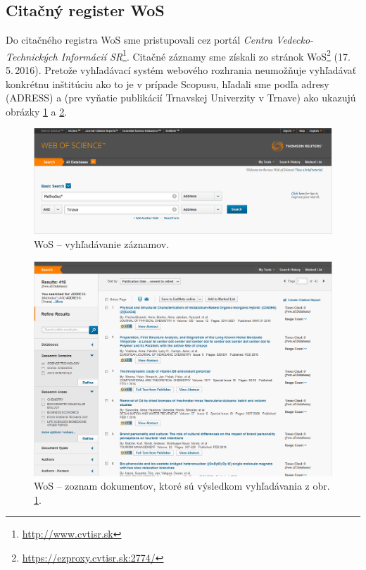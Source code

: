 \subsection{Citačný register WoS}

Do citačného registra WoS sme pristupovali cez portál \emph{Centra
  Vedecko-Technických Informácií SR}\footnote{\url{http://www.cvtisr.sk}}.
Citačné záznamy sme získali zo stránok
WoS\footnote{\url{https://ezproxy.cvtisr.sk:2774/}} (17.\,5.\,2016).  Pretože
vyhľadávací systém webového rozhrania neumožňuje vyhľadávať konkrétnu inštitúciu
ako to je v prípade Scopusu, hľadali sme podľa adresy (ADRESS)  a
 (pre vyňatie publikácií Trnavskej Univerzity v Trnave) ako
ukazujú obrázky \ref{fig:wos.search} a \ref{fig:wos.documentlist}.

\begin{figure}
  \centering
  \includegraphics[width=\textwidth]{obr/wos01-cut.jpg}
  \caption{WoS -- vyhľadávanie záznamov.}
  \label{fig:wos.search}
\end{figure}

\begin{figure}
  \centering
  \includegraphics[width=\textwidth]{obr/wos02-cut.jpg}
  \caption{WoS -- zoznam dokumentov, ktoré sú výsledkom vyhľadávania z obr.\,\ref{fig:wos.search}.}
  \label{fig:wos.documentlist}
\end{figure}

